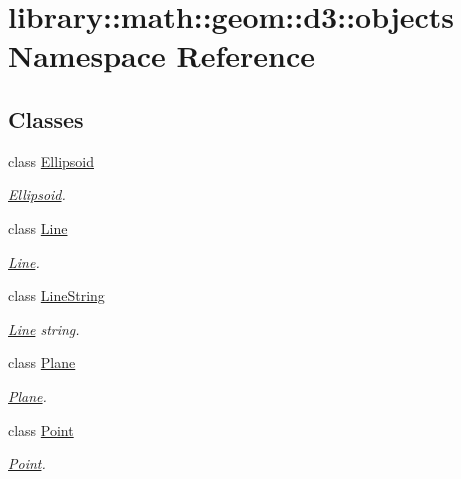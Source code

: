 \hypertarget{namespacelibrary_1_1math_1_1geom_1_1d3_1_1objects}{}\section{library\+:\+:math\+:\+:geom\+:\+:d3\+:\+:objects Namespace Reference}
\label{namespacelibrary_1_1math_1_1geom_1_1d3_1_1objects}
\subsection*{Classes}
\begin{DoxyCompactItemize}
\item 
class \hyperlink{classlibrary_1_1math_1_1geom_1_1d3_1_1objects_1_1_ellipsoid}{Ellipsoid}
\begin{DoxyCompactList}\small\item\em \hyperlink{classlibrary_1_1math_1_1geom_1_1d3_1_1objects_1_1_ellipsoid}{Ellipsoid}. \end{DoxyCompactList}\item 
class \hyperlink{classlibrary_1_1math_1_1geom_1_1d3_1_1objects_1_1_line}{Line}
\begin{DoxyCompactList}\small\item\em \hyperlink{classlibrary_1_1math_1_1geom_1_1d3_1_1objects_1_1_line}{Line}. \end{DoxyCompactList}\item 
class \hyperlink{classlibrary_1_1math_1_1geom_1_1d3_1_1objects_1_1_line_string}{Line\+String}
\begin{DoxyCompactList}\small\item\em \hyperlink{classlibrary_1_1math_1_1geom_1_1d3_1_1objects_1_1_line}{Line} string. \end{DoxyCompactList}\item 
class \hyperlink{classlibrary_1_1math_1_1geom_1_1d3_1_1objects_1_1_plane}{Plane}
\begin{DoxyCompactList}\small\item\em \hyperlink{classlibrary_1_1math_1_1geom_1_1d3_1_1objects_1_1_plane}{Plane}. \end{DoxyCompactList}\item 
class \hyperlink{classlibrary_1_1math_1_1geom_1_1d3_1_1objects_1_1_point}{Point}
\begin{DoxyCompactList}\small\item\em \hyperlink{classlibrary_1_1math_1_1geom_1_1d3_1_1objects_1_1_point}{Point}. \end{DoxyCompactList}\item 

\end{DoxyCompactItemize}
